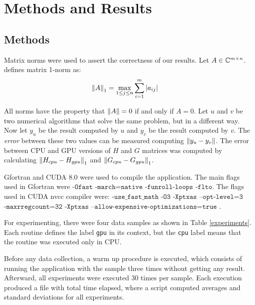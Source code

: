 \chapter{Methods and Results}
\label{cap:conclusoes}

\section{Methods}

Matrix norms were used to assert the correctness of our results. 
Let %
$A \in \mathbb{C}^{m \times n}$. \cite{watkins:2004} defines  
matrix 1-norm as:
\begin{equation}
	\left\lVert A\right\rVert_{   1  } = \max\limits_{1 \leq j \leq n} \sum_{i=1}^{m} |a_{ij}| \quad
\end{equation}

All norms have the property that $\left\lVert A\right\rVert = 0$ if and only if $A = 0$.
Let $u$ and $v$ be two numerical 
algorithms that solve the same problem, but in a different way. 
Now let $y_u$ be the result computed by $u$ and $y_v$ be the result computed by
$v$. The \textit{error} between these two values can be measured computing
$\left\lVert y_u - y_v\right\rVert$. The error between CPU and GPU versions of $H$ and $G$ matrices was computed by calculating $\left\lVert H_{cpu} - H_{gpu}\right\rVert_1$
and $\left\lVert G_{cpu} - G_{gpu}\right\rVert_1$.

Gfortran and CUDA 8.0 were used to compile the application. The main flags used in Gfortran were
$\texttt{-Ofast}$ $\texttt{-march=native}$ $\texttt{-funroll-loops}$ $\texttt{-flto}$. The flags used in
CUDA nvcc compiler were: $\texttt{-use\_fast\_math}$  $\texttt{-O3}$ $\texttt{-Xptxas}$ $\texttt{--opt-level=3}$
$\texttt{-maxrregcount=32}$ $\texttt{-Xptxas}$ 
$\texttt{--allow-expensive-optimizations=true}$ . 

For experimenting, there were four data samples as shown in Table \ref{experiments}. Each routine defines 
the label \texttt{gpu} in its context, but the \texttt{cpu} label means that the routine was executed only in CPU. 

Before any data collection, a warm up procedure is executed, which consists of running the 
application with the sample three times without getting any result. Afterward, all experiments 
were executed 30 times per sample. Each execution produced a file with total time elapsed, 
where a script computed averages and standard deviations for all experiments.


